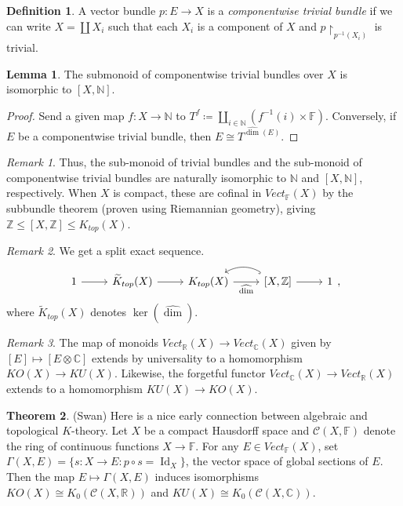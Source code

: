 \documentclass[10pt,letterpaper,cm]{nupset}
\theoremstyle{definition}
\newtheorem{definition}{Definition}
\theoremstyle{theorem}
\newtheorem{theorem}{Theorem}
\newtheorem{lemma}[theorem]{Lemma}
\theoremstyle{remark}
\newtheorem{remark}{Remark}
\newcommand{\C}{\mathbb C}
\newcommand{\F}{\mathbb F}
\newcommand{\N}{\mathbb N}
\newcommand{\R}{\mathbb R}
\newcommand{\Z}{\mathbb Z}
\newcommand{\1}{\mathbf{1}}
\newcommand{\0}{\vec 0}
\DeclareMathOperator{\id}{Id}
\begin{document}
\begin{definition}
A vector bundle $p: E \to X$ is a \textit{componentwise trivial bundle} if we can write $X =\coprod X_i$ such that each $X_i$ is a component of $X$ and $p\restriction_{p^{-1}(X_i)}$ is trivial. 
\end{definition}
\begin{lemma}
The submonoid of componentwise trivial bundles over $X$ is isomorphic to $[X, \N]$.
\end{lemma}
\begin{proof}
Send a given map $f: X \to \N$ to $T^f \coloneqq \coprod_{i \in \N} (f^{-1}(i) \times \F)$. Conversely, if $E$ be a componentwise trivial bundle, then $E \cong T^{\widehat{\dim}(E)}$.
\end{proof}

\begin{remark}
Thus, the sub-monoid  of trivial bundles and the sub-monoid of componentwise trivial bundles are naturally isomorphic to $\N$ and $[X, \N]$, respectively.  When $X$ is compact, these are cofinal in $Vect_{\F}(X)$ by the subbundle theorem (proven using Riemannian geometry), giving $\Z \leq [X, \Z] \leq K_{top}(X)$.
\end{remark}

\begin{remark}
We get a split exact sequence. 
\[
\begin{tikzcd}
1 \arrow[r] & \widetilde{K}_{top}(X) \arrow[r] & K_{top}(X) \arrow[r, "\widehat{\dim}"'] & {[X, \mathbb Z]} \arrow[r] \arrow[l, hook, bend right] & 1
\end{tikzcd},
\] where $\widetilde{K}_{top}(X)$ denotes $\ker(\widehat{\dim})$.
\end{remark}

\begin{remark}
The map of monoids $Vect_{\R}(X) \to Vect_{\C}(X)$ given by $[E] \mapsto [E \otimes \C]$ extends by universality to a homomorphism $KO(X) \to KU(X)$. Likewise, the forgetful functor $Vect_{\C}(X) \to Vect_{\R}(X)$ extends to a homomorphism $KU(X) \to KO(X)$.
\end{remark}

\begin{theorem}{(Swan)}
Here is a nice early connection between algebraic and topological $K$-theory. Let $X$ be a compact Hausdorff space and $\mathcal C(X, \F)$ denote the ring of continuous functions $X \to \F$. For any $E \in Vect_{\F}(X)$, set $\Gamma(X, E) = \{s: X \to E : p \circ s = \id_X\}$, the vector space of global sections of $E$. Then the map $E \mapsto \Gamma(X, E)$ induces isomorphisms $KO(X) \cong K_0(\mathcal C(X, \R))$ and $KU(X) \cong K_0( \mathcal C(X, \C))$.
\end{theorem}
\end{document}
